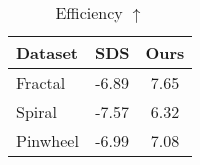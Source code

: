 \begin{wraptable}{r}{0.35\columnwidth}
    \small
    \centering
    \caption{
        {\small Efficiency $\uparrow$}
    }
    \vspace{-2mm}
    \label{tab:efficiency}
    \setlength{\tabcolsep}{1mm}

    \begin{tabular}{lcc} 
         \toprule
         \textbf{Dataset} & \textbf{SDS} & \textbf{Ours}  \\
         \midrule
         Fractal &  -6.89 & 7.65 \\
         \addlinespace[2pt]
         Spiral & -7.57 & 6.32 \\
         \addlinespace[2pt]
         Pinwheel & -6.99 & 7.08 \\
         \bottomrule
    \end{tabular}
\end{wraptable}